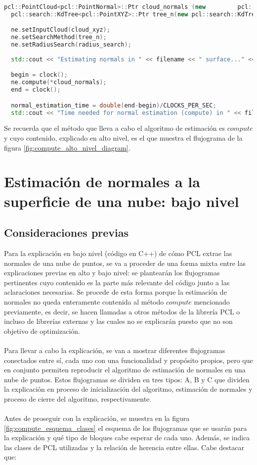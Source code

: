 \begin{lstlisting}[language=C++,breaklines]
  pcl::PointCloud<pcl::PointNormal>::Ptr cloud_normals (new 		pcl::PointCloud<pcl::PointNormal>);
  pcl::search::KdTree<pcl::PointXYZ>::Ptr tree_n(new pcl::search::KdTree<pcl::PointXYZ>());

  ne.setInputCloud(cloud_xyz);
  ne.setSearchMethod(tree_n);
  ne.setRadiusSearch(radius_search);
 
  std::cout << "Estimating normals in " << filename << " surface..." <<std::endl;

  begin = clock();
  ne.compute(*cloud_normals);
  end = clock();

  normal_estimation_time = double(end-begin)/CLOCKS_PER_SEC;
  std::cout << "Time needed for normal estimation (compute) in " << filename << ": " << normal_estimation_time << " seconds" << std::endl << std::endl;
\end{lstlisting}

Se recuerda que el método que lleva a cabo el algoritmo de estimación es $compute$ y cuyo contenido, explicado en alto nivel, es el que muestra el flujograma de la figura \ref{fig:compute_alto_nivel_diagram}.


\section{Estimación de normales a la superficie de una nube: bajo nivel}
\subsection{Consideraciones previas}
Para la explicación en bajo nivel (código en C++) de cómo PCL extrae las normales de una nube de puntos, se va a proceder de una forma mixta entre las explicaciones previas en alto y bajo nivel: se plantearán los flujogramas pertinentes cuyo contenido es la parte más relevante del código junto a las aclaraciones necesarias. Se procede de esta forma porque la estimación de normales no queda enteramente contenida al método $compute$ mencionado previamente, es decir, se hacen llamadas a otros métodos de la librería PCL o incluso de librerías externas y las cuales no se explicarán puesto que no son objetivo de optimización.
\\
\\
Para llevar a cabo la explicación, se van a mostrar diferentes flujogramas conectados entre sí, cada uno con una funcionalidad y propósito propios, pero que en conjunto permiten reproducir el algoritmo de estimación de normales en una nube de puntos. Estos flujogramas se dividen en tres tipos: A, B y C que dividen la explicación en proceso de inicialización del algoritmo, estimación de normales y proceso de cierre del algoritmo, respectivamente.
\\
\\
Antes de proseguir con la explicación, se muestra en la figura \ref{fig:compute_esquema_clases} el esquema de los flujogramas que se usarán para la explicación y qué tipo de bloques cabe esperar de cada uno. Además, se indica las clases de PCL utilizadas y la relación de herencia entre ellas. Cabe destacar que:

